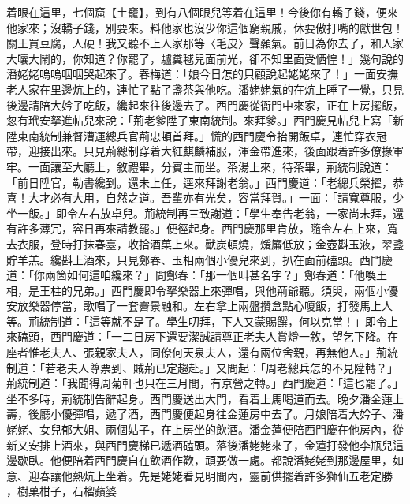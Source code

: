 \begin{showcontents}{}
着眼在這里，七個窟【土竉】，到有八個眼兒等着在這里！今後你有轎子錢，便來他家來；沒轎子錢，別要來。料他家也沒少你這個窮親戚，休要傲打嘴的獻世包！關王買豆腐，人硬！我又聽不上人家那等〈毛皮〉聲顙氣。前日為你去了，和人家大嚷大鬧的，你知道？你罷了，驢糞毬兒面前光，卻不知里面受恓惶！」幾句說的潘姥姥嗚嗚咽咽哭起來了。春梅道：「娘今日怎的只顧說起姥姥來了！」一面安撫老人家在里邊炕上的，連忙了點了盞茶與他吃。潘姥姥氣的在炕上睡了一覺，只見後邊請陪大妗子吃飯，纔起來往後邊去了。西門慶從衙門中來家，正在上房擺飯，忽有玳安拏進帖兒來說：「荊老爹陞了東南統制。來拜爹。」西門慶見帖兒上寫「新陞東南統制兼督漕運總兵官荊忠頓首拜。」慌的西門慶令抬開飯卓，連忙穿衣冠帶，迎接出來。只見荊總制穿着大紅麒麟補服，渾金帶進來，後面跟着許多僚掾軍牢。一面讓至大廳上，敘禮畢，分賓主而坐。茶湯上來，待茶畢，荊統制說道：「前日陞官，勒書纔到。還未上任，逕來拜謝老翁。」西門慶道：「老總兵榮擢，恭喜！大才必有大用，自然之道。吾輩亦有光矣，容當拜賀。」一面：「請寬尊服，少坐一飯。」即令左右放卓兒。荊統制再三致謝道：「學生奉告老翁，一家尚未拜，還有許多薄冗，容日再來請教罷。」便徑起身。西門慶那里肯放，隨令左右上來，寬去衣服，登時打抹春臺，收拾酒菓上來。獸炭頓燒，煖簾低放；金壺斟玉液，翠盞貯羊羔。纔斟上酒來，只見鄭春、玉相兩個小優兒來到，扒在面前磕頭。西門慶道：「你兩箇如何這咱纔來？」問鄭春：「那一個叫甚名字？」鄭春道：「他喚王相，是王柱的兄弟。」西門慶即令拏樂器上來彈唱，與他荊爺聽。須臾，兩個小優安放樂器停當，歌唱了一套霽景融和。左右拿上兩盤攢盒點心嗄飯，打發馬上人等。荊統制道：「這等就不是了。學生叨拜，下人又蒙賜饌，何以克當！」即令上來磕頭，西門慶道：「一二日房下還要潔誠請尊正老夫人賞燈一敘，望乞下降。在座者惟老夫人、張親家夫人，同僚何天泉夫人，還有兩位舍親，再無他人。」荊統制道：「若老夫人尊票到、賊荊已定趨赴。」又問起：「周老總兵怎的不見陞轉？」荊統制道：「我聞得周菊軒也只在三月間，有京營之轉。」西門慶道：「這也罷了。」坐不多時，荊統制告辭起身。西門慶送出大門，看着上馬喝道而去。晚夕潘金蓮上壽，後廳小優彈唱，遞了酒，西門慶便起身往金蓮房中去了。月娘陪着大妗子、潘姥姥、女兒郁大姐、兩個姑子，在上房坐的飲酒。潘金蓮便陪西門慶在他房內，從新又安排上酒來，與西門慶梯已遞酒磕頭。落後潘姥姥來了，金蓮打發他李瓶兒這邊歇臥。他便陪着西門慶自在飲酒作歡，頑耍做一處。都說潘姥姥到那邊屋里，如意、迎春讓他熱炕上坐着。先是姥姥看見明間內，靈前供擺着許多獅仙五老定勝 ，樹菓柑子，石榴蘋婆 
\end{showcontents}
